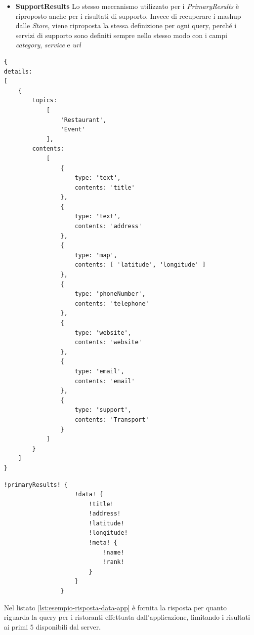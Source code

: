 \begin{itemize}
	\item \textbf{SupportResults} Lo stesso meccanismo utilizzato per i \emph{PrimaryResults} è riproposto anche per i risultati di supporto. Invece di recuperare i mashup dalle \emph{Store}, viene riproposta la stessa definizione per ogni query, perché i servizi di supporto sono definiti sempre nello stesso modo con i campi \emph{category}, \emph{service} e \emph{url}
\end{itemize}

\begin{center}
	\hspace*{-1.5cm}
	\begin{minipage}[t]{0.63\textwidth}
		\begin{lstlisting}[caption=Mashup di partenza, label=lst:esempio-data-mashup]
{	
details: 
[ 
	{ 
		topics:	
			[ 
				'Restaurant',
				'Event' 
			],
		contents: 
			[ 
				{ 
					type: 'text', 
					contents: 'title' 
				},
				{ 
					type: 'text', 
					contents: 'address'
				},
				{ 
					type: 'map', 
					contents: [ 'latitude', 'longitude' ] 
				},
				{ 
					type: 'phoneNumber', 
					contents: 'telephone' 
				},
				{ 
					type: 'website', 
					contents: 'website' 
				},
				{ 
					type: 'email',
					contents: 'email' 
				},
				{ 
					type: 'support', 
					contents: 'Transport' 
				}
			] 
		}
	]	
}
		\end{lstlisting}
	\end{minipage}%
	\begin{minipage}[t]{0.63\textwidth}
		\begin{lstlisting}[caption=Definizione oggetto GraphQL per risultati primari, label=lst:esempio-primary-app,style=json]
				!primaryResults! {
					!data! {
						!title!
						!address!
						!latitude!
						!longitude!
						!meta! {
							!name!
							!rank!
						}
					}
				}
		\end{lstlisting}
	\end{minipage}	
\end{center}

Nel listato \ref{lst:esempio-risposta-data-app} è fornita la risposta per quanto riguarda la query per i ristoranti effettuata dall'applicazione, limitando i risultati ai primi 5 disponibili dal server. 

